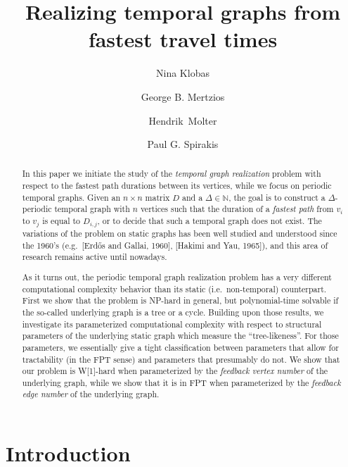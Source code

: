 \documentclass[a4paper,UKenglish,cleveref, autoref, thm-restate, anonymous]{lipics-v2021}
\title{Realizing temporal graphs from fastest travel times} %
\author{Nina Klobas}{Department of Computer Science, Durham University, UK}{nina.klobas@durham.ac.uk}{ https://orcid.org/0000-0002-8024-5782}{}
\author{George B. Mertzios}{Department of Computer Science, Durham University, UK}{george.mertzios@durham.ac.uk}{https://orcid.org/0000-0001-7182-585X}{Supported by the EPSRC grant EP/P020372/1.}
\author{Hendrik~Molter}{Department of Computer Science, Ben-Gurion~University~of~the~Negev, 
Beer-Sheva, 
Israel}{molterh@post.bgu.ac.il}{https://orcid.org/0000-0002-4590-798X}{Supported by the ISF, grant No.~1456/18, and the ERC, grant number 949707.}
\author{Paul G. Spirakis}{Department of Computer Science, University of Liverpool, UK}{p.spirakis@liverpool.ac.uk}{https://orcid.org/0000-0001-5396-3749}{Supported by the EPSRC grant EP/P02002X/1.}
\begin{document}
\maketitle

\begin{abstract}
In this paper we initiate the study of the \emph{temporal graph realization} problem with respect to the fastest path durations between its vertices, 
while we focus on periodic temporal graphs. 
Given an $n \times n$ matrix $D$ and a $\Delta \in \mathbb{N}$, the goal is to construct a $\Delta$-periodic temporal graph with $n$ vertices 
such that the duration of a \emph{fastest path} from $v_i$ to $v_j$ is equal to $D_{i,j}$, or to decide that such a temporal graph does not exist. 
The variations of the problem on static graphs has been well studied and understood since the 1960's (e.g.\ [Erd\H{o}s and Gallai, 1960], [Hakimi and Yau, 1965]), and this area of research remains active until nowadays. 

As it turns out, the periodic temporal graph realization problem has a very different computational complexity behavior than its static (i.e.~non-temporal) counterpart. 
First we show that the problem is NP-hard in general, but polynomial-time solvable if the so-called underlying graph is a tree or a cycle.
Building upon those results, we investigate its parameterized computational complexity with respect to structural parameters of the underlying static graph which measure the ``tree-likeness''. For those parameters, we essentially give a tight classification between parameters that allow for tractability (in the FPT sense) and parameters that presumably do not.
We show that our problem is W[1]-hard when parameterized by the \emph{feedback vertex number} of the underlying graph, while we show that it is in FPT when parameterized by the \emph{feedback edge number} of the underlying graph. 





\end{abstract}



\section{Introduction}\label{intro-sec}
\end{document}
